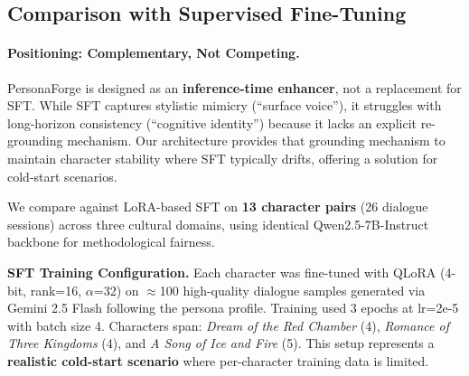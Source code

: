 \documentclass[11pt]{article}
\begin{document}
\begin{CJK*}{UTF8}{gbsn}
\subsection{Comparison with Supervised Fine-Tuning}
\label{sec:sft_comparison}

\paragraph{Positioning: Complementary, Not Competing.} PersonaForge is designed as an \textbf{inference-time enhancer}, not a replacement for SFT. While SFT captures stylistic mimicry (``surface voice''), it struggles with long-horizon consistency (``cognitive identity'') because it lacks an explicit re-grounding mechanism. Our architecture provides that grounding mechanism to maintain character stability where SFT typically drifts, offering a solution for cold-start scenarios.

We compare against LoRA-based SFT on \textbf{13 character pairs} (26 dialogue sessions) across three cultural domains, using identical Qwen2.5-7B-Instruct backbone for methodological fairness.

\textbf{SFT Training Configuration.} Each character was fine-tuned with QLoRA (4-bit, rank=16, $\alpha$=32) on $\approx$100 high-quality dialogue samples generated via Gemini 2.5 Flash following the persona profile. Training used 3 epochs at lr=2e-5 with batch size 4. Characters span: \textit{Dream of the Red Chamber} (4), \textit{Romance of Three Kingdoms} (4), and \textit{A Song of Ice and Fire} (5). This setup represents a \textbf{realistic cold-start scenario} where per-character training data is limited.

\begin{table}[t]
\centering
\small
{}
\caption{Four-group comparison on 30-turn dialogues (N=26 sessions). Rep.=response repetition rate (first-50-char overlap). Low-resource SFT shows \textit{highest} repetition (57.7\%) and drift (66.0\%), a characteristic failure mode in data-limited settings.}
\label{tab:sft_comparison}
\end{table}


\end{CJK*}
\end{document}
